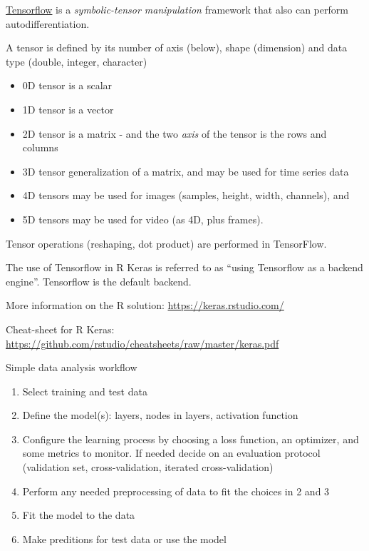 \documentclass[10pt,ignorenonframetext,]{beamer}
\providecommand{\tightlist}{%
  \setlength{\itemsep}{0pt}\setlength{\parskip}{0pt}}
\begin{document}
\begin{frame}

\href{https://www.tensorflow.org/}{Tensorflow} is a
\emph{symbolic-tensor manipulation} framework that also can perform
autodifferentiation.

A tensor is defined by its number of axis (below), shape (dimension) and
data type (double, integer, character)

\begin{itemize}
\tightlist
\item
  0D tensor is a scalar
\item
  1D tensor is a vector
\item
  2D tensor is a matrix - and the two \emph{axis} of the tensor is the
  rows and columns
\item
  3D tensor generalization of a matrix, and may be used for time series
  data
\item
  4D tensors may be used for images (samples, height, width, channels),
  and
\item
  5D tensors may be used for video (as 4D, plus frames).
\end{itemize}

Tensor operations (reshaping, dot product) are performed in TensorFlow.

The use of Tensorflow in R Keras is referred to as ``using Tensorflow as
a backend engine''. Tensorflow is the default backend.

\end{frame}

\begin{frame}

More information on the R solution: \url{https://keras.rstudio.com/}

Cheat-sheet for R Keras:
\url{https://github.com/rstudio/cheatsheets/raw/master/keras.pdf}

\end{frame}

\begin{frame}

\begin{block}{Simple data analysis workflow}

\begin{enumerate}
\tightlist
\item
  Select training and test data
\item
  Define the model(s): layers, nodes in layers, activation function
\item
  Configure the learning process by choosing a loss function, an
  optimizer, and some metrics to monitor. If needed decide on an
  evaluation protocol (validation set, cross-validation, iterated
  cross-validation)
\item
  Perform any needed preprocessing of data to fit the choices in 2 and 3
\item
  Fit the model to the data
\item
  Make preditions for test data or use the model
\end{enumerate}

\end{block}

\end{frame}
\end{document}
